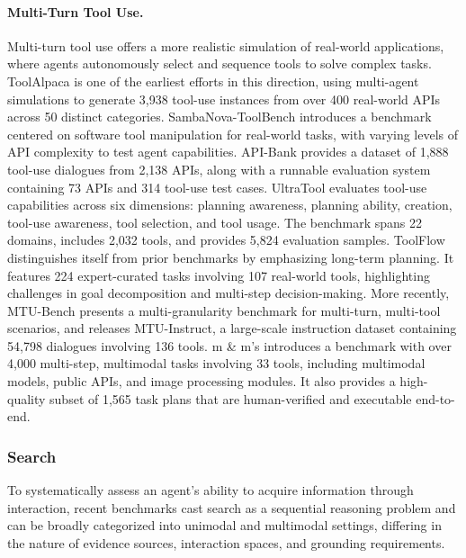 \paragraph{Multi-Turn Tool Use.}
Multi-turn tool use offers a more realistic simulation of real-world applications, where agents autonomously select and sequence tools to solve complex tasks. ToolAlpaca \cite{DBLP:journals/corr/abs-2306-05301} is one of the earliest efforts in this direction, using multi-agent simulations to generate 3,938 tool-use instances from over 400 real-world APIs across 50 distinct categories. SambaNova-ToolBench \cite{DBLP:journals/corr/abs-2305-16504} introduces a benchmark centered on software tool manipulation for real-world tasks, with varying levels of API complexity to test agent capabilities. API-Bank \cite{DBLP:conf/emnlp/LiZ000YLHL23} provides a dataset of 1,888 tool-use dialogues from 2,138 APIs, along with a runnable evaluation system containing 73 APIs and 314 tool-use test cases.  UltraTool \cite{DBLP:conf/acl/HuangZLZGLHZWSJ24} evaluates tool-use capabilities across six dimensions: planning awareness, planning ability, creation, tool-use awareness, tool selection, and tool usage. The benchmark spans 22 domains, includes 2,032 tools, and provides 5,824 evaluation samples. ToolFlow distinguishes itself from prior benchmarks by emphasizing long-term planning. It features 224 expert-curated tasks involving 107 real-world tools, highlighting challenges in goal decomposition and multi-step decision-making. More recently, MTU-Bench \cite{DBLP:conf/iclr/WangWWLSPDZWPZG25} presents a multi-granularity benchmark for multi-turn, multi-tool scenarios, and releases MTU-Instruct, a large-scale instruction dataset containing 54,798 dialogues involving 136 tools. m \& m's introduces a benchmark with over 4,000 multi-step, multimodal tasks involving 33 tools, including multimodal models, public APIs, and image processing modules. It also provides a high-quality subset of 1,565 task plans that are human-verified and executable end-to-end.

\subsubsection{Search}

To systematically assess an agent’s ability to acquire information through interaction, recent benchmarks cast search as a sequential reasoning problem and can be broadly categorized into unimodal and multimodal settings, differing in the nature of evidence sources, interaction spaces, and grounding requirements.

